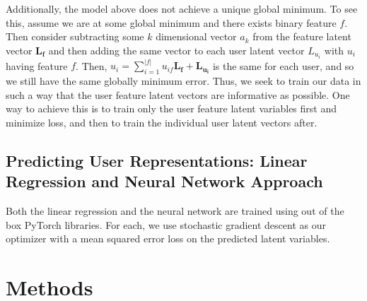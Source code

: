 \documentclass{article}
\begin{document}
Additionally, the model above does not achieve a unique global minimum. To see this, assume we are at some global minimum and there exists binary feature $f$. Then consider subtracting some $k$ dimensional vector $a_{k}$ from the feature latent vector $\mathbf{L_{f}}$ and then adding the same vector to each user latent vector $L_{u_{i}}$ with $u_{i}$ having feature $f$. Then, $u_{i} = \sum_{i=1}^{\vert f \vert} u_{if} \mathbf{L_{f}} + \mathbf{L_{u_{i}}}$ is the same for each user, and so we still have the same globally minimum error. Thus, we seek to train our data in such a way that the user feature latent vectors are informative as possible. One way to achieve this is to train only the user feature latent variables first and minimize loss, and then to train the individual user latent vectors after. 

\subsection{Predicting User Representations: Linear Regression and Neural Network Approach}
Both the linear regression and the neural network are trained using out of the box PyTorch libraries. For each, we use stochastic gradient descent as our optimizer with a mean squared error loss on the predicted latent variables. 

\section{Methods}




\end{document}
